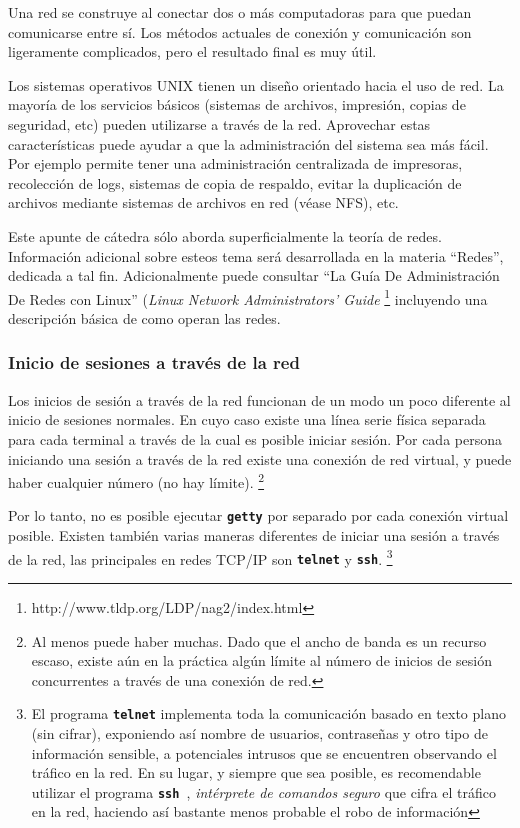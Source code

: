 \documentclass[12pt]{article}
\begin{document}
 Una red se construye al conectar dos o más computadoras para que puedan
comunicarse entre sí. Los métodos actuales de conexión y comunicación son
ligeramente complicados, pero el resultado final es muy útil.  

 Los sistemas operativos UNIX tienen un diseño orientado hacia el uso 
de red. La mayoría de los servicios básicos (sistemas de archivos, impresión, 
copias de seguridad, etc) pueden utilizarse a través de la red. Aprovechar estas
características puede ayudar a que la administración del sistema sea más fácil. 
Por ejemplo permite tener una administración centralizada de impresoras, recolección 
de logs, sistemas de copia de respaldo, evitar la duplicación 
de archivos mediante sistemas de archivos en red (véase NFS), etc.

 Este apunte de cátedra sólo aborda superficialmente la teoría de
redes. Información adicional sobre esteos tema será desarrollada en la materia 
``Redes'', dedicada a tal fin. Adicionalmente puede consultar ``La Guía De Administración 
De Redes con Linux'' (\textit{Linux Network Administrators' Guide} 
\footnote{	http://www.tldp.org/LDP/nag2/index.html}
incluyendo una descripción básica de como
operan las redes.  

\subsubsection{ Inicio de sesiones a través de la red}

 Los inicios de sesión a través de la red funcionan de un modo un poco
diferente al inicio de sesiones normales. En cuyo caso existe una línea serie 
física separada para cada terminal a través de la cual es posible iniciar sesión. 
Por cada persona iniciando una sesión a través de la red existe una conexión de red
virtual, y puede haber cualquier número (no hay límite).  
\footnote{Al menos puede haber muchas. Dado que el ancho de banda es un
recurso escaso, existe aún en la práctica algún límite al
número de inicios de sesión concurrentes a través de una conexión
de red. }

Por lo tanto, no es posible ejecutar \texttt{\textbf{getty}} por separado 
por cada conexión virtual posible. Existen
también varias maneras diferentes de iniciar una sesión a través de la red, las
principales en redes TCP/IP son \texttt{\textbf{telnet}} y \texttt{\textbf{ssh}}.
\footnote{El programa \texttt{\textbf{telnet}} implementa toda la comunicación basado en
texto plano (sin cifrar), exponiendo así nombre de usuarios, contraseñas y otro tipo de 
información sensible, a potenciales intrusos que se encuentren observando el tráfico en la red. 
En su lugar, y siempre que sea posible, es recomendable utilizar el programa \texttt{\textbf{ssh }}, 
\textit{intérprete de comandos seguro} que cifra el tráfico en la red, haciendo
así bastante menos probable el robo de información}
\end{document}
